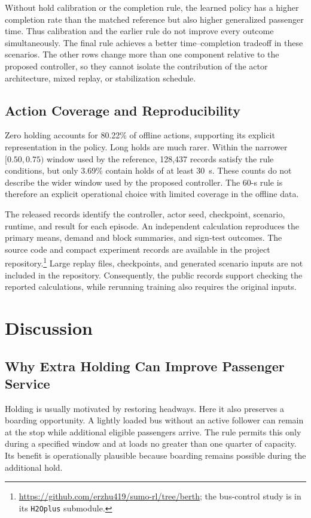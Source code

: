 \documentclass[letterpaper,journal]{IEEEtran}
\begin{document}
Without hold calibration or the completion rule, the learned policy has a higher completion rate than the matched reference but also higher generalized passenger time. Thus calibration and the earlier rule do not improve every outcome simultaneously. The final rule achieves a better time--completion tradeoff in these scenarios. The other rows change more than one component relative to the proposed controller, so they cannot isolate the contribution of the actor architecture, mixed replay, or stabilization schedule.

\subsection{Action Coverage and Reproducibility}
Zero holding accounts for 80.22\% of offline actions, supporting its explicit representation in the policy. Long holds are much rarer. Within the narrower \([0.50,0.75)\) window used by the reference, 128,437 records satisfy the rule conditions, but only 3.69\% contain holds of at least 30~s. These counts do not describe the wider window used by the proposed controller. The 60-s rule is therefore an explicit operational choice with limited coverage in the offline data.

The released records identify the controller, actor seed, checkpoint, scenario, runtime, and result for each episode. An independent calculation reproduces the primary means, demand and block summaries, and sign-test outcomes. The source code and compact experiment records are available in the project repository.\footnote{\url{https://github.com/erzhu419/sumo-rl/tree/berth}; the bus-control study is in its \texttt{H2Oplus} submodule.} Large replay files, checkpoints, and generated scenario inputs are not included in the repository. Consequently, the public records support checking the reported calculations, while rerunning training also requires the original inputs.

\section{Discussion}
\label{sec:discussion}
\subsection{Why Extra Holding Can Improve Passenger Service}
Holding is usually motivated by restoring headways. Here it also preserves a boarding opportunity. A lightly loaded bus without an active follower can remain at the stop while additional eligible passengers arrive. The rule permits this only during a specified window and at loads no greater than one quarter of capacity. Its benefit is operationally plausible because boarding remains possible during the additional hold.
\end{document}
